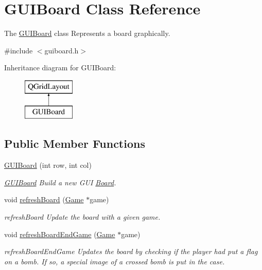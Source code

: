 \hypertarget{class_g_u_i_board}{}\section{G\+U\+I\+Board Class Reference}
\label{class_g_u_i_board}


The \hyperlink{class_g_u_i_board}{G\+U\+I\+Board} class Represents a board graphically.  




{\ttfamily \#include $<$guiboard.\+h$>$}

Inheritance diagram for G\+U\+I\+Board\+:\begin{figure}[H]
\begin{center}
\leavevmode
\includegraphics[height=2.000000cm]{class_g_u_i_board}
\end{center}
\end{figure}
\subsection*{Public Member Functions}
\begin{DoxyCompactItemize}
\item 
\hyperlink{class_g_u_i_board_a55050277239ca0bd7bfedf36439701ee}{G\+U\+I\+Board} (int row, int col)
\begin{DoxyCompactList}\small\item\em \hyperlink{class_g_u_i_board}{G\+U\+I\+Board} Build a new G\+UI \hyperlink{class_board}{Board}. \end{DoxyCompactList}\item 
void \hyperlink{class_g_u_i_board_a3e2ddf4a20541fed420ad1527e33c68a}{refresh\+Board} (\hyperlink{class_game}{Game} $\ast$game)
\begin{DoxyCompactList}\small\item\em refresh\+Board Update the board with a given game. \end{DoxyCompactList}\item 
void \hyperlink{class_g_u_i_board_aa6fd17a421d1b896a357e30c0cfe349d}{refresh\+Board\+End\+Game} (\hyperlink{class_game}{Game} $\ast$game)
\begin{DoxyCompactList}\small\item\em refresh\+Board\+End\+Game Updates the board by checking if the player had put a flag on a bomb. If so, a special image of a crossed bomb is put in the case. \end{DoxyCompactList}\end{DoxyCompactItemize}


